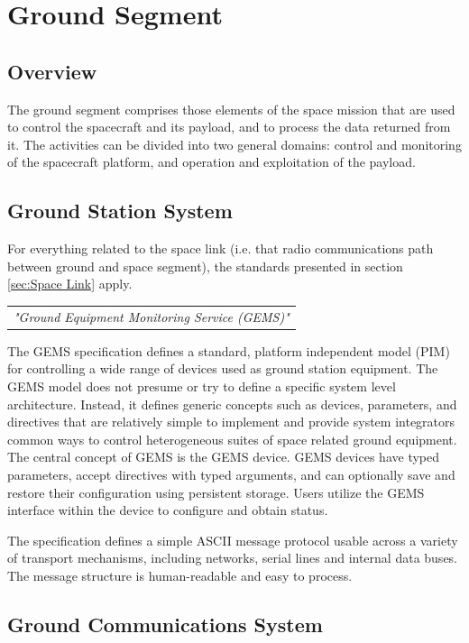 \chapter{Ground Segment}

\section{Overview}

The ground segment comprises those elements of the space mission that are used to control the spacecraft and its payload, and to process the data returned from it. The activities can be divided into two general domains: control and monitoring of the spacecraft platform, and operation and exploitation of the payload.

\section{Ground Station System}

For everything related to the space link (i.e. that radio communications path between ground and space segment), the standards presented in section \ref{sec:Space Link} apply.

\begin{tabular}{l}
\textit{"Ground Equipment Monitoring Service (GEMS)" \cite{GEMS}} \\
\end{tabular}

The GEMS specification defines a standard, platform independent model (PIM) for controlling a wide range of devices used as ground station equipment. The GEMS model does not presume or try to define a specific system level architecture. Instead, it defines generic concepts such as devices, parameters, and directives that are relatively simple to implement and provide system integrators common ways to control heterogeneous suites of space related ground equipment. The central concept of GEMS is the GEMS device. GEMS devices have typed parameters, accept directives with typed arguments, and can optionally save and restore their configuration using persistent storage. Users utilize the GEMS interface within the device to configure and obtain status.

The specification defines a simple ASCII message protocol usable across a variety of transport mechanisms, including networks, serial lines and internal data buses. The message structure is human-readable and easy to process.

\section{Ground Communications System}

